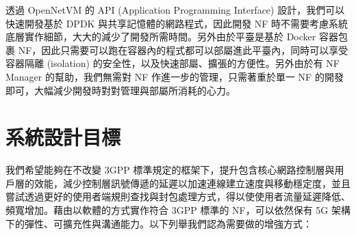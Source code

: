 透過 OpenNetVM 的 API (Application Programming Interface) 設計，我們可以快速開發基於 DPDK 與共享記憶體的網路程式，因此開發 NF 時不需要考慮系統底層實作細節，大大的減少了開發所需時間。另外由於平臺是基於 Docker 容器包裹 NF，因此只需要可以跑在容器內的程式都可以部屬進此平臺內，同時可以享受容器隔離 (isolation) 的安全性，以及快速部屬、擴張的方便性。另外由於有 NF Manager 的幫助，我們無需對 NF 作進一步的管理，只需著重於單一 NF 的開發即可，大幅減少開發時對對管理與部屬所消耗的心力。

\section{系統設計目標}
\label{sec:design_goal}

我們希望能夠在不改變 3GPP 標準規定的框架下，提升包含核心網路控制層與用戶層的效能，減少控制層訊號傳遞的延遲以加速連線建立速度與移動穩定度，並且嘗試透過更好的使用者端規則查找與封包處理方式，得以使使用者流量延遲降低、頻寬增加。藉由以軟體的方式實作符合 3GPP 標準的 NF，可以依然保有 5G 架構下的彈性、可擴充性與溝通能力。以下列舉我們認為需要做的增強方式：

